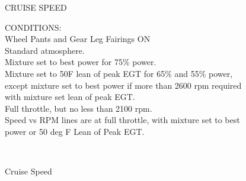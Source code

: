 \begin{figure}[t]
\begin{center}
\begin{perfhdr}CRUISE SPEED\\
\end{perfhdr}

\begin{minipage}{5in}
  \begin{flushleft}
    CONDITIONS:\\
    Wheel Pants and Gear Leg Fairings ON\\
    Standard atmosphere.\\
    Mixture set to best power for 75\% power.\\
    Mixture set to 50\textdegree F lean of peak EGT for 65\% and 55\% power, except mixture set to best power if more than 2600 rpm required with mixture set lean of peak EGT.\\
    Full throttle, but no less than 2100 rpm.\\
    Speed vs RPM lines are at full throttle, with mixture set to best power or 50 deg F Lean of Peak EGT.
    \end{flushleft}
\end{minipage}\\
\vspace{5ex}

\end{center}  %
\caption{Cruise Speed}
\label{Cruise-speed}
\end{figure}


